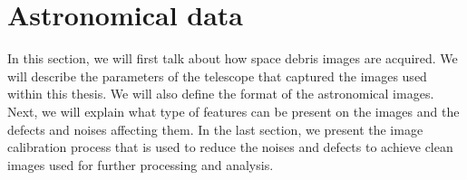 \chapter{Astronomical data} \label{chap:astronomicaldata}


In this section, we will first talk about how space debris images are acquired. We will describe the parameters of the telescope that captured the images used within this thesis. We will also define the format of the astronomical images. Next, we will explain what type of features can be present on the images and the defects and noises affecting them. In the last section, we present the image calibration process that is used to reduce the noises and defects to achieve clean images used for further processing and analysis. 







